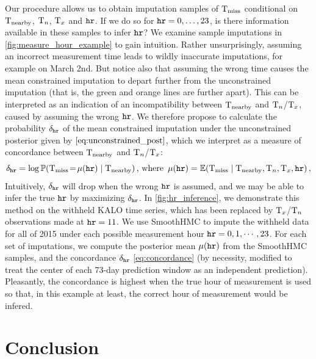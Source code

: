 \documentclass[12pt]{article}
\begin{document}
Our procedure allows us to obtain imputation samples of \(\T_\miss\) conditional on \(\T_\obs\), \(\Tn\), \(\Tx\) and \(\hour\).
If we do so for \(\hour=0,\dotsc,23\), is there information available in these samples to infer \(\hour\)?
We examine sample imputations in \autoref{fig:measure_hour_example} to gain intuition.
Rather unsurprisingly, assuming an incorrect measurement time leads to wildly inaccurate imputations, for example on March 2nd.
But notice also that assuming the wrong time causes the mean constrained imputation to depart further from the unconstrained imputation
(that is, the green and orange lines are further apart).
This can be interpreted as an indication of an incompatibility between \(\T_\obs\) and \(\Tn\)/\(\Tx\), caused by assuming the wrong \(\hour\).
We therefore propose to calculate the probability \(\concordance_\hour\) of the mean constrained imputation under the unconstrained posterior given by \(\autoref{eq:unconstrained_post}\), which we interpret as a measure of concordance between \(\T_\obs\) and \(\Tn\)/\(\Tx\):
\begin{equation}
    \concordance_\hour = \log \Pr\del{ \T_\miss \! = \! \mu\del{\hour} \mid \T_\obs }
    \,\text{, where}\ \,
    \mu\del{\hour} = \E\del{ \T_\miss \mid \T_\obs, \Tn, \Tx, \hour }\,,
\label{eq:concordance}
\end{equation}
Intuitively, \(\concordance_\hour\) will drop when the wrong \(\hour\) is assumed,
and we may be able to infer the true \(\hour\) by maximizing \(\concordance_\hour\).
In \autoref{fig:hr_inference}, we demonstrate this method on the withheld KALO time series, which
has been replaced by \(\Tx\)/\(\Tn\) observations made at \(\hour=11\).
We use SmoothHMC to impute the withheld data for all of 2015 under each possible measurement hour \(\hour=0,1,\cdots,23\).
For each set of imputations, we compute the posterior mean \(\mu\del{\hour}\) from the SmoothHMC samples, 
and the concordance \(\concordance_\hour\) \autoref{eq:concordance} (by necessity, modified to treat the center of each 73-day prediction window as an independent prediction).
Pleasantly, the concordance is highest when the true hour of measurement is used so that, in this example at least, the correct hour of measurement would be infered.

\section{Conclusion}\label{sec:conclusion}
\end{document}
